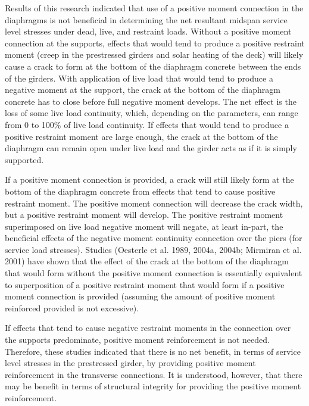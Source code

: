 Results of this research indicated that use of a positive moment connection in the diaphragms is not beneficial in determining the net resultant midspan service level stresses under dead, live, and restraint loads. Without a positive moment connection at the supports, effects that would tend to produce a positive restraint moment (creep in the prestressed girders and solar heating of the deck) will likely cause a crack to form at the bottom of the diaphragm concrete between the ends of the girders. With application of live load that would tend to produce a negative moment at the support, the crack at the bottom of the diaphragm concrete has to close before full negative moment develops. The net effect is the loss of some live load continuity, which, depending on the parameters, can range from 0 to 100\% of live load continuity. If effects that would tend to produce a positive restraint moment are large enough, the crack at the bottom of the diaphragm can remain open under live load and the girder acts as if it is simply supported.

If a positive moment connection is provided, a crack will still likely form at the bottom of the diaphragm concrete from effects that tend to cause positive restraint moment. The positive moment connection will decrease the crack width, but a positive restraint moment will develop. The positive restraint moment superimposed on live load negative moment will negate, at least in-part, the beneficial effects of the negative moment continuity connection over the piers (for service load stresses). Studies (Oesterle et al. 1989, 2004a, 2004b; Mirmiran et al. 2001) have shown that the effect of the crack at the bottom of the diaphragm that would form without the positive moment connection is essentially equivalent to superposition of a positive restraint moment that would form if a positive moment connection is provided (assuming the amount of positive moment reinforced provided is not excessive).

If effects that tend to cause negative restraint moments in the connection over the supports predominate, positive moment reinforcement is not needed. Therefore, these studies indicated that there is no net benefit, in terms of service level stresses in the prestressed girder, by providing positive moment reinforcement in the transverse connections. It is understood, however, that there may be benefit in terms of structural integrity for providing the positive moment reinforcement.

